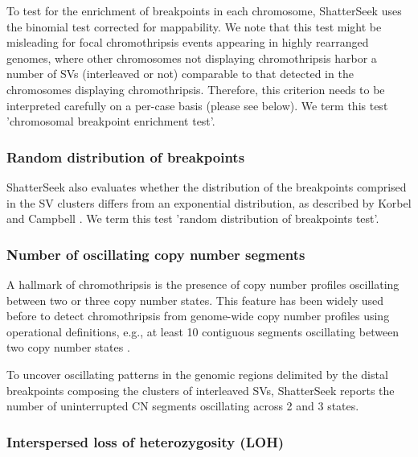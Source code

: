 \documentclass[twoside,a4wide,11pt]{article}\usepackage[]{graphicx}\usepackage[]{color}
\begin{document}
To test for the enrichment of breakpoints in each chromosome,
ShatterSeek uses the binomial test corrected for mappability. 
We note that this test might be misleading for focal chromothripsis events
appearing in highly rearranged genomes, where
other chromosomes not displaying chromothripsis harbor a number of SVs (interleaved or not) comparable to that
detected in the chromosomes displaying chromothripsis. 
Therefore, this criterion needs to be interpreted carefully on a per-case basis (please see below).
We term this test 'chromosomal breakpoint enrichment test'.

\subsubsection{Random distribution of breakpoints}
ShatterSeek also evaluates whether the distribution of the breakpoints comprised in the SV clusters
differs from an exponential distribution, as described by Korbel and Campbell \cite{Korbel2013}.
We term this test 'random distribution of breakpoints test'.

\subsubsection{Number of oscillating copy number segments}
A hallmark of chromothripsis is the 
presence of copy number profiles oscillating between two or three copy number states.
This feature has been widely used before to detect chromothripsis from 
genome-wide copy number profiles using operational definitions,
e.g., at least 10 contiguous segments oscillating between two copy number states \cite{Rausch2012}. 

To uncover oscillating patterns in the genomic regions delimited by the distal breakpoints composing 
the clusters of interleaved SVs,
ShatterSeek reports the number of uninterrupted CN segments oscillating across 2 and 3 states.

\subsubsection{Interspersed loss of heterozygosity (LOH)}
\end{document}

